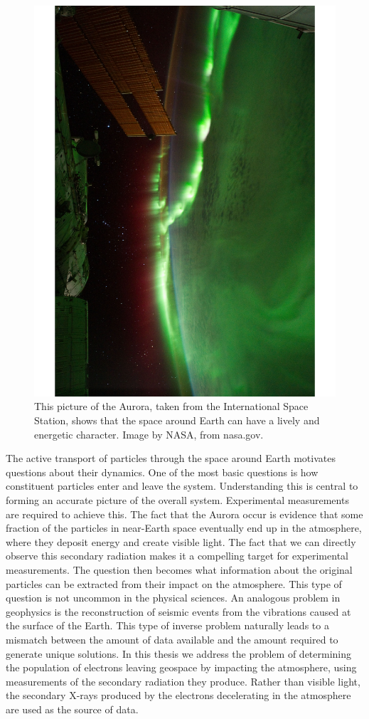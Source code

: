 \begin{figure}[h]
\label{aurora_from_space}
\begin{centering}
\includegraphics[width=.5\textwidth,angle=270]{figures/chapter_1/aurora_from_space/aurora_from_space}
\caption{This picture of the Aurora, taken from the International Space Station, shows that the space around Earth can have a lively and energetic character. Image by NASA, from nasa.gov.}
\end{centering}
\end{figure}

The active transport of particles through the space around Earth motivates questions about their dynamics. One of the most basic questions is how constituent particles enter and leave the system. Understanding this is central to forming an accurate picture of the overall system. Experimental measurements are required to achieve this. The fact that the Aurora occur is evidence that some fraction of the particles in near-Earth space eventually end up in the atmosphere, where they deposit energy and create visible light. The fact that we can directly observe this secondary radiation makes it a compelling target for experimental measurements. The question then becomes what information about the original particles can be extracted from their impact on the atmosphere. This type of question is not uncommon in the physical sciences. An analogous problem in geophysics is the reconstruction of seismic events  from the vibrations caused at the surface of the Earth. This type of inverse problem naturally leads to a mismatch between the amount of data available and the amount required to generate unique solutions. In this thesis we address the problem of determining the population of electrons leaving geospace by impacting the atmosphere, using measurements of the secondary radiation they produce. Rather than visible light, the secondary X-rays produced by the electrons decelerating in the atmosphere are used as the source of data. 

